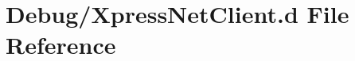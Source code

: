 \hypertarget{Debug_2XpressNetClient_8d}{}\section{Debug/\+Xpress\+Net\+Client.d File Reference}
\label{Debug_2XpressNetClient_8d}
